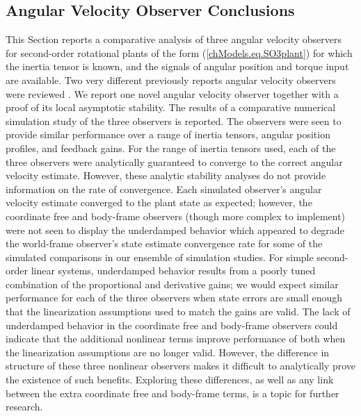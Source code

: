 \subsection{Angular Velocity Observer Conclusions}  
\label{chSMS_ID.sec.AVO_conc}


This Section reports a comparative analysis of three angular velocity
observers for second-order rotational plants of the form
(\ref{chModels.eq.SO3plant}) for which the inertia tensor is known,
and the signals of angular position and torque input are available.
Two very different previously reports angular velocity observers were
reviewed \cite{Salcudean1991,Maithripala2004}.  We report one novel
angular velocity observer together with a proof of its local
asymptotic stability.  The results of a comparative numerical
simulation study of the three observers is reported.  The observers
were seen to provide similar performance over a range of inertia
tensors, angular position profiles, and feedback gains.  For the range
of inertia tensors used, each of the three observers were analytically
guaranteed to converge to the correct angular velocity estimate.
%
However, these analytic stability analyses do not provide information
on the rate of convergence.
%
Each simulated observer's angular velocity estimate converged to the
plant state as expected; however, the coordinate free and body-frame
observers (though more complex to implement) were not seen to display
the underdamped behavior which appeared to degrade the world-frame
observer's state estimate convergence rate for some of the simulated
comparisons in our ensemble of simulation studies.
%
For simple second-order linear systems, underdamped behavior results
from a poorly tuned combination of the proportional and derivative
gains; we would expect similar performance for each of the three
observers when state errors are small enough that the linearization
assumptions used to match the gains are valid.
%
The lack of underdamped behavior in the coordinate free and body-frame
observers could indicate that the additional nonlinear terms improve
performance of both when the linearization assumptions are no longer
valid.
%
However, the difference in structure of these three nonlinear
observers makes it difficult to analytically prove the existence of
such benefits.
%
Exploring these differences, as well as any link between the extra
coordinate free and body-frame terms, is a topic for further research.
